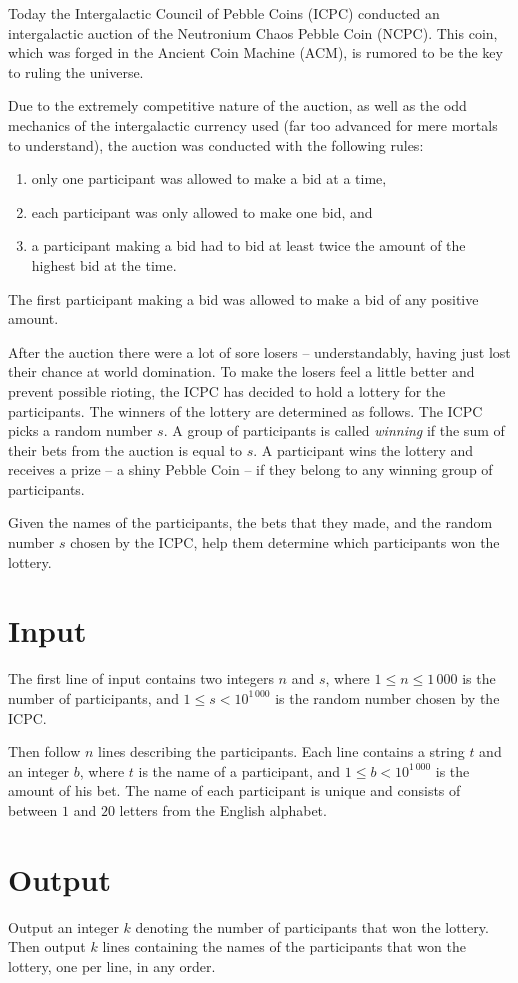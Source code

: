 
%
\noindent
Today the Intergalactic Council of Pebble Coins (ICPC) conducted an
intergalactic auction of the Neutronium Chaos Pebble Coin (NCPC). This coin,
which was forged in the Ancient Coin Machine (ACM), is rumored to be the key to
ruling the universe.

Due to the extremely competitive nature of the auction, as well as the odd
mechanics of the intergalactic currency used (far too advanced for mere mortals
to understand), the auction was conducted with the following rules:
\begin{enumerate}
\setlength{\itemsep}{0pt}
    \item only one participant was allowed to make a bid at a time,
    \item each participant was only allowed to make one bid, and
    \item a participant making a bid had to bid at least twice the amount of
        the highest bid at the time.
\end{enumerate}
The first participant making a bid was allowed to make a bid of any positive
amount.

After the auction there were a lot of sore losers -- understandably, having just
lost their chance at world domination. To make the losers feel a little better
and prevent possible rioting, the ICPC has decided to hold a lottery for the
participants. The winners of the lottery are determined as follows. The ICPC
picks a random number $s$. A group of participants is called \emph{winning} if
the sum of their bets from the auction is equal to $s$. A participant wins the
lottery and receives a prize -- a shiny Pebble Coin -- if they belong to any
winning group of participants.

Given the names of the participants, the bets that they made, and the random
number $s$ chosen by the ICPC, help them determine which participants won the
lottery.

\section*{Input}
The first line of input contains two integers $n$ and $s$, where $1 \le n \le
1\,000$ is the number of participants, and $1 \le s < 10^{1\,000}$ is the random
number chosen by the ICPC.

Then follow $n$ lines describing the participants. Each line contains a string
$t$ and an integer $b$, where $t$ is the name of a participant, and $1 \le b <
10^{1\,000}$ is the amount of his bet. The name of each participant is unique and
consists of between $1$ and $20$ letters from the English alphabet.

\section*{Output}
Output an integer $k$ denoting the number of participants that won the lottery.
Then output $k$ lines containing the names of the participants that won the
lottery, one per line, in any order.
